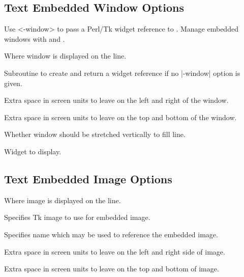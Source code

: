 \subsection*{Text Embedded Window Options}

Use <-window> to pass a Perl/Tk widget reference to .
Manage embedded windows with  and .

\begin{enum}{1cm}

Where window is displayed on the line.

Subroutine to create and return a widget reference if no |-window| option is given.

Extra space in screen units to leave on the left and right of the window.

Extra space in screen units to leave on the top and bottom of the window.

Whether window should be stretched vertically to fill line. 

Widget to display.

\end{enum}

\subsection*{Text Embedded Image Options}
\begin{enum}{1cm}

Where image is displayed on the line.

Specifies Tk image to use for embedded image.

Specifies name which may be used to reference the embedded image.

Extra space in screen units to leave on the left and right side of image.

Extra space in screen units to leave on the top and bottom of image.

\end{enum}

